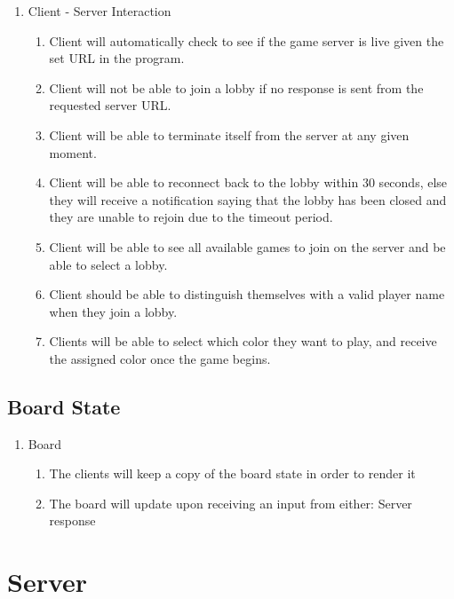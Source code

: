 \documentclass{scrreprt}
\begin{document}
\begin{enumerate}[resume*]
    \item Client - Server Interaction
    \begin{enumerate}[label*=\arabic*.]
        \item Client will automatically check to see if the game server is live given the set URL in the program.
        \item Client will not be able to join a lobby if no response is sent from the requested server URL.
        \item Client will be able to terminate itself from the server at any given moment.
        \item Client will be able to reconnect back to the lobby within 30 seconds, else they will receive a notification saying that the lobby has been closed and they are unable to rejoin due to the timeout period.
        \item Client will be able to see all available games to join on the server and be able to select a lobby.
        \item Client should be able to distinguish themselves with a valid player name when they join a lobby.
        \item Clients will be able to select which color they want to play, and receive the assigned color once the game begins.
    \end{enumerate}
\end{enumerate}

\subsection{Board State}

\begin{enumerate}[label*=R\arabic*.]
    \item Board
    \begin{enumerate}[label*=\arabic*.]
        \item The clients will keep a copy of the board state in order to render it
        \item The board will update upon receiving an input from either:
            \subitem Server response
    \end{enumerate}
\end{enumerate}

\section{Server}
\end{document}
